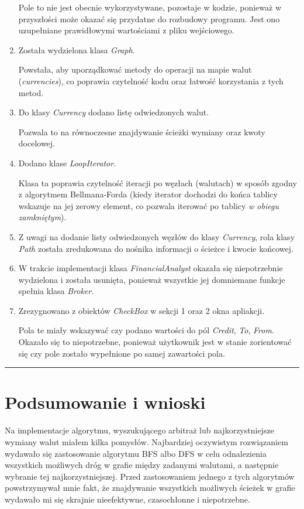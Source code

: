 \documentclass[a4paper,11pt]{article}
\newcommand{\linia}{\rule{\linewidth}{0.4mm}}
\begin{document}
\begin{enumerate}
Pole to nie jest obecnie wykorzystywane, pozostaje w kodzie, ponieważ w przyszłości może okazać się przydatne do rozbudowy programu. Jest ono uzupełniane prawidłowymi wartościami z pliku wejściowego.

\item Została wydzielona klasa \textit{Graph}.

Powstała, aby uporządkować metody do operacji na mapie walut (\textit{currencies}), co poprawia czytelność kodu oraz łatwość korzystania z tych metod.
\item Do klasy \textit{Currency} dodano listę odwiedzonych walut.

Pozwala to na równoczesne znajdywanie ścieżki wymiany oraz kwoty docelowej.
\item Dodano klase \textit{LoopIterator}.

Klasa ta poprawia czytelność iteracji po węzłach (walutach) w sposób zgodny z algorytmem Bellmana-Forda (kiedy iterator dochodzi do końca tablicy wskazuje na jej zerowy element, co pozwala iterować po tablicy \textit{w obiegu zamkniętym}).
\item Z uwagi na dodanie listy odwiedzonych węzłów do klasy \textit{Currency},  rola klasy \textit{Path} została zredukowana do nośnika informacji o ścieżce i kwocie końcowej.

\item W trakcie implementacji klasa \textit{FinancialAnalyst} okazała się niepotrzebnie wydzielona i została usunięta, ponieważ wszystkie jej domniemane funkcje spełnia klasa \textit{Broker}.
\item Zrezygnowano z obiektów \textit{CheckBox} w sekcji 1 oraz 2 okna apliakcji.

Pola te miały wskazywać czy podano wartości do pól \textit{Credit}, \textit{To}, \textit{From}. Okazało się to niepotrzebne, ponieważ użytkownik jest w stanie zorientować się czy pole zostało wypełnione po samej zawartości pola.
\end{enumerate}
\noindent\linia
\section{Podsumowanie i wnioski}
Na implementacje algorytmu, wyszukującego arbitraż lub najkorzystniejsze wymiany walut miałem kilka pomysłów. Najbardziej oczywistym rozwiązaniem wydawało się zastosowanie algorytmu BFS albo DFS w celu odnalezienia wszystkich możliwych dróg w grafie między zadanymi walutami, a następnie wybranie tej najkorzystniejszej. Przed zastosowaniem jednego z tych algorytmów powstrzymywał mnie fakt, że znajdywanie wszystkich możliwych ścieżek w grafie wydawało mi się skrajnie nieefektywne, czasochłonne i niepotrzebne.
\end{document}
